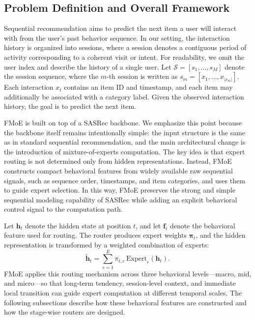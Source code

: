 \documentclass[sigconf,authordraft]{acmart}
\begin{document}
\subsection{Problem Definition and Overall Framework}
\label{sec:problem-framework}
Sequential recommendation aims to predict the next item a user will interact with from the user's past behavior sequence. In our setting, the interaction history is organized into sessions, where a session denotes a contiguous period of activity corresponding to a coherent visit or intent. For readability, we omit the user index and describe the history of a single user. Let $\mathcal{S} = [s_1, \dots, s_M]$ denote the session sequence, where the $m$-th session is written as $s_m = [x_1, \dots, x_{|s_m|}]$. Each interaction $x_t$ contains an item ID and timestamp, and each item may additionally be associated with a category label. Given the observed interaction history, the goal is to predict the next item.

FMoE is built on top of a SASRec backbone. We emphasize this point because the backbone itself remains intentionally simple: the input structure is the same as in standard sequential recommendation, and the main architectural change is the introduction of mixture-of-experts computation. The key idea is that expert routing is not determined only from hidden representations. Instead, FMoE constructs compact behavioral features from widely available raw sequential signals, such as sequence order, timestamps, and item categories, and uses them to guide expert selection. In this way, FMoE preserves the strong and simple sequential modeling capability of SASRec while adding an explicit behavioral control signal to the computation path.

Let $\mathbf{h}_t$ denote the hidden state at position $t$, and let $\mathbf{f}_t$ denote the behavioral feature used for routing. The router produces expert weights $\boldsymbol{\pi}_t$, and the hidden representation is transformed by a weighted combination of experts:
\[
\tilde{\mathbf{h}}_t
=
\sum_{e=1}^{E}
\pi_{t,e}\,\mathrm{Expert}_e(\mathbf{h}_t).
\]
FMoE applies this routing mechanism across three behavioral levels---macro, mid, and micro---so that long-term tendency, session-level context, and immediate local transition can guide expert computation at different temporal scales. The following subsections describe how these behavioral features are constructed and how the stage-wise routers are designed.
\end{document}
